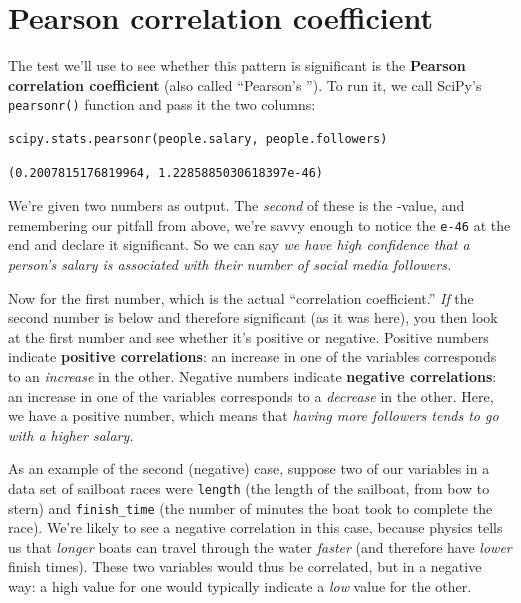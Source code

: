 \section{Pearson correlation coefficient}

The test we'll use to see whether this pattern is significant is the
\textbf{Pearson correlation coefficient} (also called ``Pearson's ''). To
run it, we call SciPy's \texttt{pearsonr()} function and pass it the two
columns:

\begin{Verbatim}[fontsize=\small,samepage=true,frame=single,framesep=3mm]
scipy.stats.pearsonr(people.salary, people.followers)
\end{Verbatim}
\vspace{-.2in}

\begin{Verbatim}[fontsize=\small,samepage=true,frame=leftline,framesep=5mm,framerule=1mm]
(0.2007815176819964, 1.2285885030618397e-46)
\end{Verbatim}

We're given two numbers as output. The \textit{second} of these is the
-value, and remembering our pitfall from above, we're savvy enough to notice
the \texttt{e-46} at the end and declare it significant. So we can say
\textit{we have high confidence that a person's salary is associated with their
number of social media followers.}


Now for the first number, which is the actual ``correlation coefficient.''
\textit{If} the second number is below  and therefore significant (as
it was here), you then look at the first number and see whether it's positive
or negative. Positive numbers indicate \textbf{positive correlations}: an
increase in one of the variables corresponds to an \textit{increase} in the
other. Negative numbers indicate \textbf{negative correlations}: an increase in
one of the variables corresponds to a \textit{decrease} in the other. Here, we
have a positive number, which means that \textit{having more followers tends to
go with a higher salary.}

As an example of the second (negative) case, suppose two of our variables in a
data set of sailboat races were \texttt{length} (the length of the sailboat,
from bow to stern) and \texttt{finish\_time} (the number of minutes the boat
took to complete the race). We're likely to see a negative correlation in this
case, because physics tells us that \textit{longer} boats can travel through
the water \textit{faster} (and therefore have \textit{lower} finish times).
These two variables would thus be correlated, but in a negative way: a high
value for one would typically indicate a \textit{low} value for the other.
